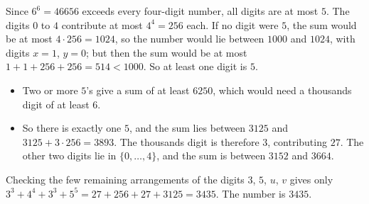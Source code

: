 Since $6^6=46656$ exceeds every four-digit number, all digits are at most $5$. The digits $0$ to $4$ contribute at most $4^4=256$ each. If no digit were $5$, the sum would be at most $4\cdot256=1024$, so the number would lie between $1000$ and $1024$, with digits $x=1$, $y=0$; but then the sum would be at most $1+1+256+256=514<1000$. So at least one digit is $5$.
\begin{itemize}
\item Two or more $5$'s give a sum of at least $6250$, which would need a thousands digit of at least $6$.
\item So there is exactly one $5$, and the sum lies between $3125$ and $3125+3\cdot256=3893$. The thousands digit is therefore $3$, contributing $27$. The other two digits lie in $\{0,\dots,4\}$, and the sum is between $3152$ and $3664$.
\end{itemize}
Checking the few remaining arrangements of the digits $3$, $5$, $u$, $v$ gives only $3^3+4^4+3^3+5^5=27+256+27+3125=3435$. The number is $\boxed{3435}$.

